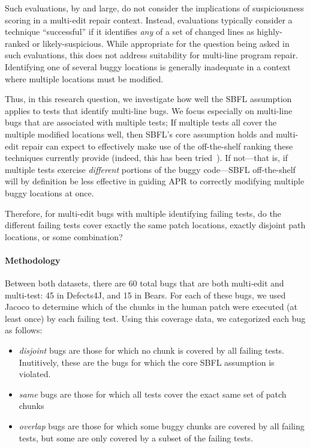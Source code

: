 Such evaluations, by and large, do not consider the implications of
suspiciousness scoring in a multi-edit repair context.  Instead, evaluations
typically consider a technique ``successful'' if it identifies \emph{any} of a
set of changed lines as highly-ranked or likely-suspicious.  While appropriate
for the question being asked in such evaluations, this does not address
suitability for multi-line program repair.  Identifying one of several buggy
locations is generally inadequate in a context where multiple locations must be
modified.  

Thus, in this research question, we investigate how well the SBFL assumption
applies to tests that identify multi-line bugs. We focus especially on
multi-line bugs that are associated with multiple tests;  If multiple tests all cover the multiple
modified locations well, then SBFL's core assumption holds and multi-edit repair
can expect to effectively make use of the off-the-shelf ranking these techniques
currently provide (indeed, this has been tried~\cite{angelix}). If not---that
is, if multiple tests exercise \emph{different} portions of the buggy
code---SBFL off-the-shelf will by definition be less effective in guiding APR to
correctly modifying multiple buggy locations at once.

Therefore, for multi-edit bugs with multiple identifying failing tests, do the 
different failing tests cover exactly the same patch locations, exactly 
disjoint path locations, or some combination?



\paragraph{Methodology}

Between both datasets, there are 60 total bugs that are both multi-edit and 
multi-test: 45 in Defects4J, and 15 in Bears. For each of these bugs, we used 
Jacoco to determine which of the chunks in the human patch were executed (at
least once) by each failing test. Using 
this coverage data, we categorized each bug as follows:
\begin{itemize}
\item \emph{disjoint} bugs are those for which no chunk is covered by all
failing tests.  Inutitively, these are the bugs for which the core SBFL
assumption is violated.
\item \emph{same} bugs are those for which all tests cover the exact same set of
  patch chunks
\item \emph{overlap} bugs are those for which some buggy chunks are covered by
  all failing tests, but some are only covered by a subset of the failing tests.
\end{itemize}


